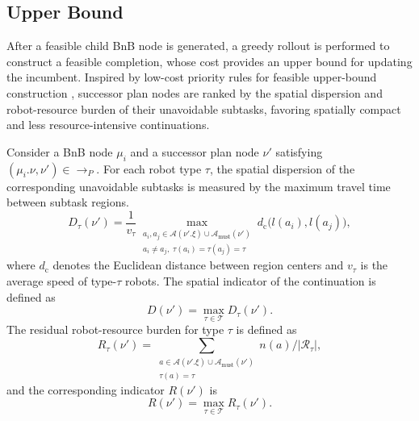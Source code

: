 \documentclass[lettersize,journal]{IEEEtran}
\theoremstyle{italiclemma}
\theoremstyle{italiclemma}
\theoremstyle{definition}
\begin{document}
\subsection{Upper Bound}


After a feasible child BnB node is generated, a greedy rollout is performed to construct a feasible completion, whose cost provides an upper bound for updating the incumbent. Inspired by low-cost priority rules for feasible upper-bound construction \cite{Brucker1998RCPSP,Liu2023BnB}, successor plan nodes are ranked by the spatial dispersion and robot-resource burden of their unavoidable subtasks, favoring spatially compact and less resource-intensive continuations.

Consider a BnB node $\mu_i$ and a successor plan node $\nu'$ satisfying $(\mu_i.\nu,\nu')\in\rightarrow_P$. For each robot type $\tau$, the spatial dispersion of the corresponding unavoidable subtasks is measured by the maximum travel time between subtask regions.
\begin{equation}
D_\tau(\nu')
=
\frac{1}{v_\tau}
\max_{\substack{
a_i,a_j\in
\mathcal A(\nu'.\xi)\cup\mathcal A_{\mathrm{must}}(\nu')\\
a_i\neq a_j,\;
\tau(a_i)=\tau(a_j)=\tau
}}
d_{\mathrm c}\bigl(l(a_i),l(a_j)\bigr),
\label{eq:rollout_spatial_type}
\end{equation}
where $d_{\mathrm c}$ denotes the Euclidean distance between region centers and $v_\tau$ is the average speed of type-$\tau$ robots. The spatial indicator of the continuation is defined as
\begin{equation}
D(\nu')
=
\max_{\tau\in\mathcal T} D_\tau(\nu').
\label{eq:rollout_spatial}
\end{equation}
The residual robot-resource burden for type $\tau$ is defined as
\begin{equation}
R_\tau(\nu')
=
\displaystyle
\sum_{\substack{
a\in
\mathcal A(\nu'.\xi)\cup\mathcal A_{\mathrm{must}}(\nu')\\
\tau(a)=\tau
}}
n(a)
/
|\mathcal R_\tau|
,
\label{eq:rollout_resource_type}
\end{equation}
and the corresponding indicator $R(\nu')$ is
\begin{equation}
R(\nu')
=
\max_{\tau\in\mathcal T}R_\tau(\nu').
\label{eq:rollout_resource}
\end{equation}
\end{document}
